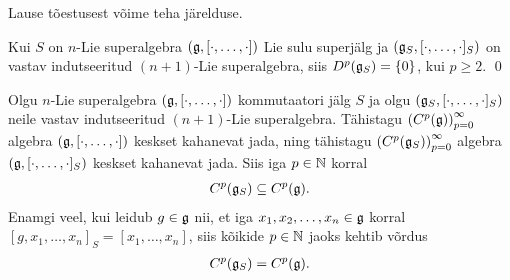 Lause tõestusest võime teha järelduse.

\begin{jar}
    Kui $S$ on $n$-Lie superalgebra $(\mathfrak{g}, [\cdot, \dots, \cdot])$
    Lie sulu superjälg ja $(\mathfrak{g}_S, [\cdot, \dots, \cdot]_S)$ on
    vastav indutseeritud $(n+1)$-Lie superalgebra, siis
    $D^p(\mathfrak{g}_S) = \{0\}$, kui $p \geq 2$. \hfill \qed
\end{jar}

\begin{lau}
    Olgu $n$-Lie superalgebra $(\mathfrak{g}, [\cdot, \dots, \cdot])$
    kommutaatori jälg $S$ ja olgu $(\mathfrak{g}_S, [\cdot, \dots, \cdot]_S)$
    neile vastav indutseeritud $(n+1)$-Lie superalgebra.
    Tähistagu $\left(C^p(\mathfrak{g})\right)_{p=0}^\infty$ algebra
    $(\mathfrak{g}, [\cdot, \dots, \cdot])$
    keskset kahanevat jada, ning tähistagu
    $\left(C^p(\mathfrak{g}_S)\right)_{p=0}^\infty$ algebra 
    $(\mathfrak{g}, [\cdot, \dots, \cdot]_S)$
    keskset kahanevat jada. Siis iga $p \in \mathbb{N}$ korral
    \begin{align*}
        C^p(\mathfrak{g}_S) \subseteq C^p(\mathfrak{g}).
    \end{align*}
    Enamgi veel, kui leidub $g \in \mathfrak{g}$ nii, et iga
    $x_1, x_2, \dots, x_n \in \mathfrak{g}$ korral
    $[g, x_1, \dots, x_n]_S = [x_1, \dots, x_n]$, siis
    kõikide $p \in \mathbb{N}$ jaoks kehtib võrdus
    \begin{align*}
        C^p(\mathfrak{g}_S) = C^p(\mathfrak{g}).
    \end{align*}
\end{lau}

